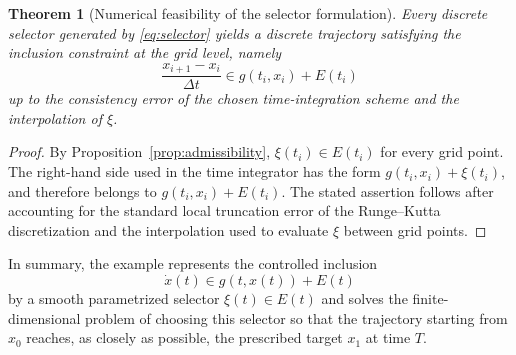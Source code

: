 \documentclass[11pt]{article}
\newtheorem{theorem}{Theorem}[section]
\theoremstyle{definition}
\theoremstyle{remark}
\begin{document}
\begin{theorem}[Numerical feasibility of the selector formulation]
\label{thm:feasibility}
Every discrete selector generated by \eqref{eq:selector} yields a discrete trajectory satisfying the inclusion constraint at the grid level, namely
\begin{equation}
    \frac{x_{i+1}-x_i}{\Delta t}\in g(t_i,x_i)+E(t_i)
\end{equation}
up to the consistency error of the chosen time-integration scheme and the interpolation of $\xi$.
\end{theorem}

\begin{proof}
By Proposition~\ref{prop:admissibility}, $\xi(t_i)\in E(t_i)$ for every grid point. The right-hand side used in the time integrator has the form $g(t_i,x_i)+\xi(t_i)$, and therefore belongs to $g(t_i,x_i)+E(t_i)$. The stated assertion follows after accounting for the standard local truncation error of the Runge--Kutta discretization and the interpolation used to evaluate $\xi$ between grid points.
\end{proof}

In summary, the example represents the controlled inclusion
\begin{equation}
    \dot{x}(t)\in g(t,x(t))+E(t)
\end{equation}
by a smooth parametrized selector $\xi(t)\in E(t)$ and solves the finite-dimensional problem of choosing this selector so that the trajectory starting from $x_0$ reaches, as closely as possible, the prescribed target $x_1$ at time $T$.
\end{document}
